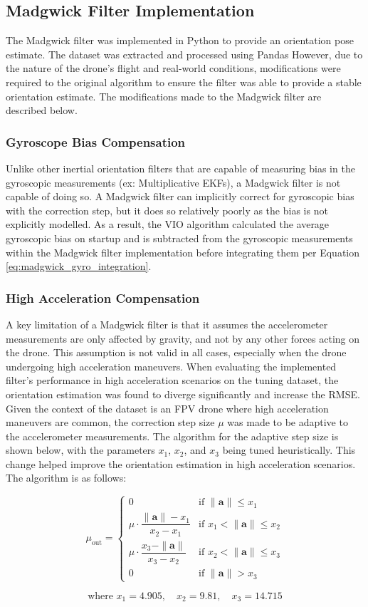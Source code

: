 \documentclass[bare_jrnl_transmag]{subfiles}
\begin{document}
\subsection{Madgwick Filter Implementation}
The Madgwick filter was implemented in Python to provide an orientation pose estimate. The dataset was extracted and processed using Pandas \cite{pandas} However, due to the nature of the drone's flight and real-world conditions, modifications were required to the original algorithm to ensure the filter was able to provide a stable orientation estimate. The modifications made to the Madgwick filter are described below. \newline

\subsubsection{Gyroscope Bias Compensation}
Unlike other inertial orientation filters that are capable of measuring bias in the gyroscopic measurements (ex: Multiplicative EKFs), a Madgwick filter is not capable of doing so. A Madgwick filter can implicitly correct for gyroscopic bias with the correction step, but it does so relatively poorly as the bias is not explicitly modelled. As a result, the VIO algorithm calculated the average gyroscopic bias on startup and is subtracted from the gyroscopic measurements within the Madgwick filter implementation before integrating them per Equation \ref{eq:madgwick_gyro_integration}. \newline

\subsubsection{High Acceleration Compensation}
A key limitation of a Madgwick filter is that it assumes the accelerometer measurements are only affected by gravity, and not by any other forces acting on the drone. This assumption is not valid in all cases, especially when the drone undergoing high acceleration maneuvers. When evaluating the implemented filter's performance in high acceleration scenarios on the tuning dataset, the orientation estimation was found to diverge significantly and increase the RMSE. Given the context of the dataset is an FPV drone where high acceleration maneuvers are common, the correction step size $\mu$ was made to be adaptive to the accelerometer measurements. The algorithm for the adaptive step size is shown below, with the parameters $x_1$, $x_2$, and $x_3$ being tuned heuristically. This change helped improve the orientation estimation in high acceleration scenarios. The algorithm is as follows:

\[
\mu_{\text{out}} =
\begin{cases}
0 & \text{if } \|\mathbf{a}\| \leq x_1 \\
\mu \cdot \dfrac{\|\mathbf{a}\| - x_1}{x_2 - x_1} & \text{if } x_1 < \|\mathbf{a}\| \leq x_2 \\
\mu \cdot \dfrac{x_3 - \|\mathbf{a}\|}{x_3 - x_2} & \text{if } x_2 < \|\mathbf{a}\| \leq x_3 \\
0 & \text{if } \|\mathbf{a}\| > x_3
\end{cases}
\]

\[
\text{where } x_1 = 4.905, \quad x_2 = 9.81, \quad x_3 = 14.715
\]
\end{document}
